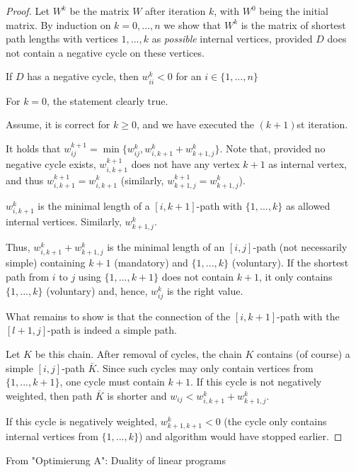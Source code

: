 \begin{proof}
\newcommand{\wii}[0]{w_{ii}}
\newcommand{\wij}[0]{w_{ij}}

Let $W^k$ be the matrix $W$ after iteration $k$, with $W^0$ being the initial matrix. By induction on $k = 0, ..., n$ we show that $W^k$ is the matrix of shortest path lengths with vertices $1, ..., k$ as \emph{possible} internal vertices, provided $D$ does not contain a negative cycle on these vertices.

If $D$ has a negative cycle, then $\wii^k < 0$ for an $i \in \{ 1, ..., n\}$

For $k = 0$, the statement clearly true.

Assume, it is correct for $k \geq 0$, and we have executed the $(k+1)$st iteration.

It holds that $\wij^{k+1} = \min\{\wij^k, w_{i,k+1}^k + w_{k+1,j}^k\}$. Note that, provided no negative cycle exists, $w_{i,k+1}^{k+1}$ does not have any vertex $k+1$ as internal vertex, and thus $w_{i,k+1}^{k+1} = w_{i,k+1}^k$ (similarly, $w_{k+1,j}^{k+1} = w_{k+1,j}^k$).

$w_{i,k+1}^k$ is the minimal length of a $[i,k+1]$-path with $\{1, ..., k\}$ as allowed internal vertices. Similarly, $w_{k+1,j}^k$.

Thus, $w_{i,k+1}^k+w_{k+1,j}^k$ is the minimal length of an $[i,j]$-path (not necessarily simple) containing $k+1$ (mandatory) and $\{ 1, ..., k \}$ (voluntary). If the shortest path from $i$ to $j$ using $\{1, ..., k+1\}$ does not contain $k+1$, it only contains $\{1, ... , k\}$ (voluntary) and, hence, $\wij^k$ is the right value.

What remains to show is that the connection of the $[i,k+1]$-path with the $[l+1,j]$-path is indeed a simple path.

Let $K$ be this chain. After removal of cycles, the chain $K$ contains (of course) a simple $[i,j]$-path $\bar K$. Since such cycles may only contain vertices from $\{1, ..., k+1\}$, one cycle must contain $k+1$.
If this cycle is not negatively weighted, then path $\bar K$ is shorter and $\wij< w_{i,k+1}^k + w_{k+1,j}^k$.

If this cycle is negatively weighted, $w_{k+1,k+1}^k<0$ (the cycle only contains internal vertices from $\{1, ..., k\}$) and algorithm would have stopped earlier.
\end{proof}


From "Optimierung A": Duality of linear programs

